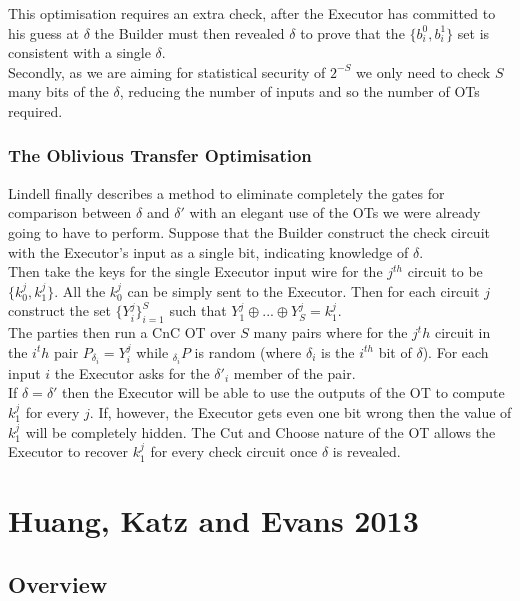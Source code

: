 \documentclass[ %
                    author={Nicholas Tutte},
                supervisor={Prof. Nigel Smart},
                    degree={MEng},
                     title={Secure Two Party Computation},
                  subtitle={A practical comparison of recent protocols},
                      type={Research - GG1K},
                      year={2015} ]{dissertation}
\begin{document}
				This optimisation requires an extra check, after the Executor has committed to his guess at $\delta$ the Builder must then revealed $\delta$ to prove that the $\{b_i^0, b_i^1\}$ set is consistent with a single $\delta$.\\

				Secondly, as we are aiming for statistical security of $2^{-S}$ we only need to check $S$ many bits of the $\delta$, reducing the number of inputs and so the number of OTs required.

				\subsubsection{The Oblivious Transfer Optimisation}
					Lindell finally describes a method to eliminate completely the gates for comparison between $\delta$ and $\delta'$ with an elegant use of the OTs we were already going to have to perform. Suppose that the Builder construct the check circuit with the Executor's input as a single bit, indicating knowledge of $\delta$.\\

					Then take the keys for the single Executor input wire for the $j^{th}$ circuit to be $\{k_0^j, k_1^j\}$. All the $k_0^j$ can be simply sent to the Executor. Then for each circuit $j$ construct the set $\{Y_i^j\}_{i = 1}^{S}$ such that $Y_1^j \oplus ... \oplus Y_S^j = k_1^j$.\\

					The parties then run a CnC OT over $S$ many pairs where for the $j^th$ circuit in the $i^th$ pair $P_{\delta_i} = Y_i^j$ while $_{\delta_i}P$ is random (where $\delta_i$ is the $i^{th}$ bit of $\delta$). For each input $i$ the Executor asks for the $\delta'_i$ member of the pair.\\

					If $\delta = \delta'$ then the Executor will be able to use the outputs of the OT to compute $k_1^j$ for every $j$. If, however, the Executor gets even one bit wrong then the value of $k_1^j$ will be completely hidden. The Cut and Choose nature of the OT allows the Executor to recover $k_1^j$ for every check circuit once $\delta$ is revealed.

				

		\section{Huang, Katz and Evans 2013}
			\subsection*{Overview}
\end{document}
